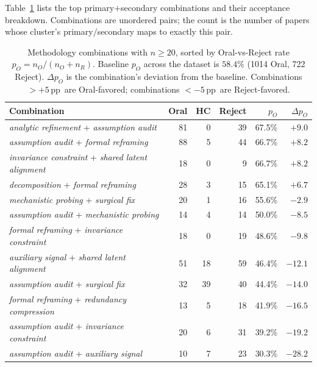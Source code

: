 \documentclass[10pt,a4paper]{article}
\begin{document}
Table~\ref{tab:combos} lists the top primary$+$secondary combinations and their acceptance breakdown. Combinations are unordered pairs; the count is the number of papers whose cluster's primary$/$secondary maps to exactly this pair.

\begin{table}[htbp]
\centering
\caption{Methodology combinations with $n{\geq}20$, sorted by Oral-vs-Reject rate $p_O = n_O / (n_O + n_R)$. Baseline $p_O$ across the dataset is $\mathbf{58.4\%}$ (1014 Oral, 722 Reject). $\Delta p_O$ is the combination's deviation from the baseline. Combinations $>+5\,$pp\ are Oral-favored; combinations $<-5\,$pp\ are Reject-favored.}
\label{tab:combos}
\small
\begin{tabular}{p{8.6cm} rrr r r}
\toprule
\textbf{Combination} & \textbf{Oral} & \textbf{HC} & \textbf{Reject} & \textbf{$p_O$} & \textbf{$\Delta p_O$} \\
\midrule
\textit{analytic refinement} + \textit{assumption audit}            &  81 &  0 &  39 & 67.5\% & $+9.0$ \\
\textit{assumption audit} + \textit{formal reframing}               &  88 &  5 &  44 & 66.7\% & $+8.2$ \\
\textit{invariance constraint} + \textit{shared latent alignment}   &  18 &  0 &   9 & 66.7\% & $+8.2$ \\
\textit{decomposition} + \textit{formal reframing}                  &  28 &  3 &  15 & 65.1\% & $+6.7$ \\
\midrule
\textit{mechanistic probing} + \textit{surgical fix}                &  20 &  1 &  16 & 55.6\% & $-2.9$ \\
\textit{assumption audit} + \textit{mechanistic probing}            &  14 &  4 &  14 & 50.0\% & $-8.5$ \\
\textit{formal reframing} + \textit{invariance constraint}          &  18 &  0 &  19 & 48.6\% & $-9.8$ \\
\textit{auxiliary signal} + \textit{shared latent alignment}        &  51 & 18 &  59 & 46.4\% & $-12.1$ \\
\textit{assumption audit} + \textit{surgical fix}                   &  32 & 39 &  40 & 44.4\% & $-14.0$ \\
\textit{formal reframing} + \textit{redundancy compression}         &  13 &  5 &  18 & 41.9\% & $-16.5$ \\
\textit{assumption audit} + \textit{invariance constraint}          &  20 &  6 &  31 & 39.2\% & $-19.2$ \\
\textit{assumption audit} + \textit{auxiliary signal}               &  10 &  7 &  23 & 30.3\% & $-28.2$ \\
\bottomrule
\end{tabular}
\end{table}
\end{document}
